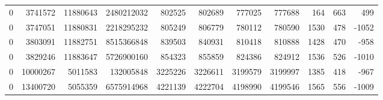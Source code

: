 \begin{tabular}{rrrrrrrrrrr}
0 & 3741572 & 11880643 & 2480212032 & 802525 & 802689 & 777025 & 777688 & 164 & 663 & 499 \\
0 & 3747051 & 11880831 & 2218295232 & 805249 & 806779 & 780112 & 780590 & 1530 & 478 & -1052 \\
0 & 3803091 & 11882751 & 8515366848 & 839503 & 840931 & 810418 & 810888 & 1428 & 470 & -958 \\
0 & 3829246 & 11883647 & 5726900160 & 854323 & 855859 & 824386 & 824912 & 1536 & 526 & -1010 \\
0 & 10000267 & 5011583 & 132005848 & 3225226 & 3226611 & 3199579 & 3199997 & 1385 & 418 & -967 \\
0 & 13400720 & 5055359 & 6575914968 & 4221139 & 4222704 & 4198990 & 4199546 & 1565 & 556 & -1009 \\
\bottomrule
\end{tabular}
